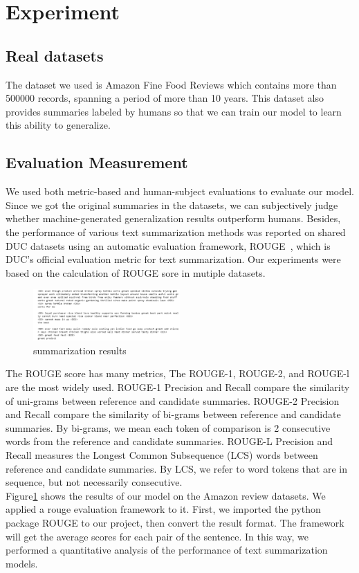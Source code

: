 \documentclass[conference]{IEEEtran}
\begin{document}
\section{Experiment}
\subsection{Real datasets}
The dataset we used is Amazon Fine Food Reviews which contains more than 500000 records, spanning a period of more than 10 years. This dataset also provides summaries labeled by humans so that we can train our model to learn this ability to generalize. 
\subsection{Evaluation Measurement}
We used both metric-based and human-subject evaluations to evaluate our model. Since we got the original summaries in the datasets, we can subjectively judge whether machine-generated generalization results outperform humans.  Besides, the performance of various text summarization methods was reported on shared DUC datasets using an automatic evaluation framework, ROUGE~\cite{lin-2004-rouge}, which is DUC’s official evaluation metric for text summarization. Our experiments were based on the calculation of ROUGE sore in mutiple datasets.

\begin{figure}[h]
\centering
\includegraphics[width=0.5\textwidth]{imgs/Results.png}
\caption{summarization results}
\label{fig:Results}
\end{figure}
The ROUGE score has many metrics, The ROUGE-1, ROUGE-2, and ROUGE-l are the most widely used. ROUGE-1 Precision and Recall compare the similarity of uni-grams between reference and candidate summaries. ROUGE-2 Precision and Recall compare the similarity of bi-grams between reference and candidate summaries. By bi-grams, we mean each token of comparison is 2 consecutive words from the reference and candidate summaries. ROUGE-L Precision and Recall measures the Longest Common Subsequence (LCS) words between reference and candidate summaries. By LCS, we refer to word tokens that are in sequence, but not necessarily consecutive. \\
Figure\ref{fig:Results} shows the results of our model on the Amazon review datasets. We applied a rouge evaluation framework to it. First, we imported the python package ROUGE to our project, then convert the result format. The framework will get the average scores for each pair of the sentence. In this way, we performed a quantitative analysis of the performance of text summarization models.
\end{document}
